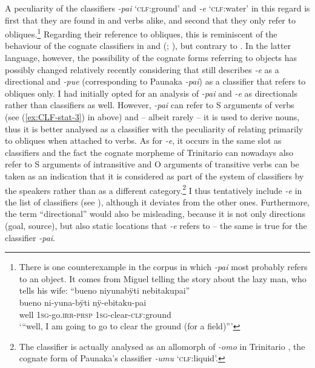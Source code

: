 A peculiarity of the classifiers \textit{-pai} ‘\textsc{clf:}ground' and \textit{-e} ‘\textsc{clf:}water’ in this regard is first that they are found in  and  verbs alike, and second that they only refer to obliques.\footnote{There is one counterexample in the corpus in which \textit{-pai} most probably refers to an object. It comes from Miguel telling the story about the lazy man, who tells his wife:
\ea\label{ex:pai-OBJ}
\begingl
\glpreamble “bueno niyunabÿti nebitakupai”\\
\gla bueno ni-yuna-bÿti nÿ-ebitaku-pai\\
\glb well 1\textsc{sg}-go.\textsc{irr}-\textsc{prsp} 1\textsc{sg}-clear-\textsc{clf:}ground\\
\glft ‘“well, I am going to go to clear the ground (for a field)”’
\endgl
\trailingcitation{[mox-n110920l.020]}
\xe} Regarding their reference to obliques, this is reminiscent of the behaviour of the cognate classifiers in  and  (\citealp[cf.][156]{Terhart2016}; \citealt[271]{OlzaZubiri2004}), but contrary to  \citep[cf.]{Rose2019b,Rose2020}. In the latter language, however, the possibility of the cognate forms referring to objects has possibly changed relatively recently considering that \citet[176, 205]{Gill1957} still describes \textit{-e} as a directional and \textit{-pue} (corresponding to Paunaka \textit{-pai}) as a classifier that refers to obliques only. I had initially opted for an analysis of \textit{-pai} and \textit{-e} as directionals rather than classifiers as well. However, \textit{-pai} can refer to S arguments of  verbs (see (\ref{ex:CLF-stat-3}) in  above) and -- albeit rarely -- it is used to derive nouns, thus it is better analysed as a classifier with the peculiarity of relating primarily to obliques when attached to verbs. As for \textit{-e}, it occurs in the same slot as classifiers and the fact the cognate morpheme of Trinitario can nowadays also refer to S arguments of intransitive and O arguments of transitive verbs can be taken as an indication that it is considered as part of the system of classifiers by the speakers rather than as a different category.\footnote{The classifier is actually analysed as an allomorph of \textit{-omo} in Trinitario \citep[464]{Rose2019b}, the cognate form of Paunaka’s classifier \textit{-umu} ‘\textsc{clf:}liquid’.} I thus tentatively include \textit{-e} in the list of classifiers (see ), although it deviates from the other ones. Furthermore, the term “directional” would also be misleading, because it is not only directions (goal, source), but also static locations that \textit{-e} refers to -- the same is true for the classifier \textit{-pai}.

